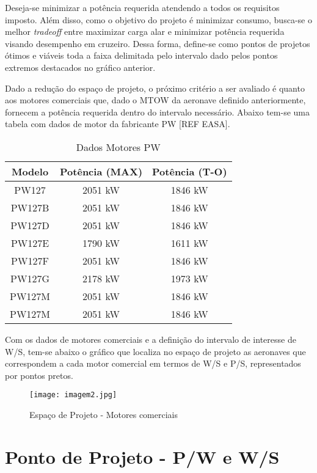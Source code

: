 Deseja-se minimizar a potência requerida atendendo a todos os requisitos imposto.
Além disso, como o objetivo do projeto é minimizar consumo, busca-se o melhor \emph{tradeoff} entre maximizar carga alar e minimizar potência requerida visando desempenho em cruzeiro.
Dessa forma, define-se como pontos de projetos ótimos e viáveis toda a faixa delimitada pelo intervalo dado pelos pontos extremos destacados no gráfico anterior.

Dado a redução do espaço de projeto, o próximo critério a ser avaliado é quanto aos motores comerciais que, dado o MTOW da aeronave definido anteriormente, fornecem a potência requerida dentro do intervalo necessário.
Abaixo tem-se uma tabela com dados de motor da fabricante PW [REF EASA]. 


\begin{table}[H]
\centering
\begin{tabular}{ccc}
\toprule
Modelo & Potência (MAX) & Potência (T-O) \\ \midrule
PW127 & 2051 kW & 1846 kW \\
PW127B & 2051 kW & 1846 kW \\
PW127D & 2051 kW & 1846 kW \\
PW127E & 1790 kW & 1611 kW \\
PW127F & 2051 kW & 1846 kW \\
PW127G & 2178 kW & 1973 kW \\
PW127M & 2051 kW & 1846 kW \\
PW127M & 2051 kW & 1846 kW \\
\bottomrule
\end{tabular}
\caption[Dados Motores - PW]{Dados Motores PW}
\label{tbl:motores_pw}
\end{table}

Com os dados de motores comerciais e a definição do intervalo de interesse de W/S, tem-se abaixo o gráfico que localiza no espaço de projeto as aeronaves que correspondem a cada motor comercial em termos de W/S e P/S, representados por pontos pretos.

\begin{figure}[H]
\centering
\texttt{[image: imagem2.jpg]}
\caption[Espaço de Projeto - Motores comerciais]{Espaço de Projeto - Motores comerciais}
\label{fig:diagr_motor}
\end{figure}

\section{Ponto de Projeto - P/W e W/S}
\label{sec:ponto_de_projeto}

